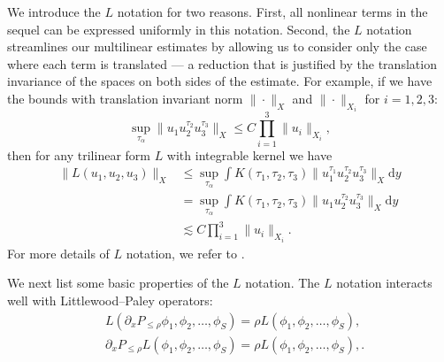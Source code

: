 \documentclass[11pt,letterpaper,reqno]{amsart}
\numberwithin{equation}{section}
\theoremstyle{definition}
\theoremstyle{remark}
\begin{document}
We introduce the $L$ notation for two reasons. First, all nonlinear terms in the sequel can be expressed uniformly in this notation. Second, the $L$ notation streamlines our multilinear estimates by allowing us to consider only the case where each term is translated — a reduction that is justified by the translation invariance of the spaces on both sides of the estimate.   For example, if we have the bounds with translation invariant norm $\|\cdot\|_X$ and $\|\cdot\|_{X_i}$ for $i =1 ,2 ,3$:
$$\sup_{\tau_\alpha}\| u_1 u_2^{\tau_2} u_3^{\tau_3} \|_{X}\le C\prod_{i=1}^3 \|u_i\|_{X_i},$$
then for any trilinear form $L$ with integrable kernel we have 
\begin{align*}
  \|L(u_1,u_2,u_3)\|_{X} &\le\sup_{\tau_\alpha} \int K(\tau_1,\tau_2,\tau_3)\|u_1^{\tau_1} u_2^{\tau_2}u_3^{\tau_3}\|_{X}\mathrm{d}y \\
  &=\sup_{\tau_\alpha} \int K(\tau_1,\tau_2,\tau_3)\|u_1  u_2^{\tau_2}u_3^{\tau_3}\|_{X}\mathrm{d}y \\
  &\lesssim C\prod_{i=1}^3 \|u_i\|_{X_i}.
\end{align*}
For more details of \(L\) notation, we refer to \cite{IfT24, TaoCMP02}.

 
We next list some basic properties of the $L$ notation. The $L$ notation interacts well with Littlewood–Paley operators: 
  \begin{align}
& L (\partial_x P_{\leq \rho} \phi_1, \phi_2, \ldots, \phi_S )= \rho  L (\phi_1, \phi_2, \ldots, \phi_S ), \label{L_formula_1}\\
& \partial_x P_{\leq \rho} L (\phi_1, \phi_2, \ldots, \phi_S )=\rho  L (\phi_1, \phi_2, \ldots, \phi_S ),\label{L_formula_2}.
\end{align}  
\end{document}
